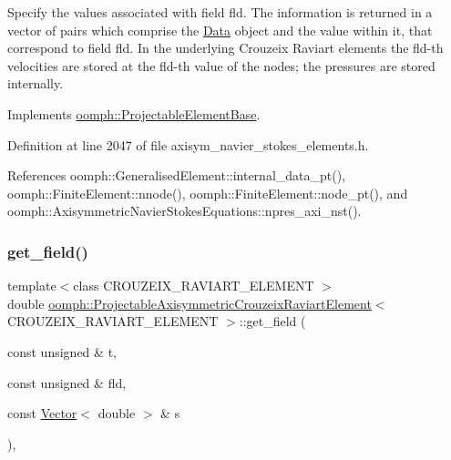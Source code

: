 Specify the values associated with field fld. The information is returned in a vector of pairs which comprise the \hyperlink{classoomph_1_1Data}{Data} object and the value within it, that correspond to field fld. In the underlying Crouzeix Raviart elements the fld-\/th velocities are stored at the fld-\/th value of the nodes; the pressures are stored internally. 



Implements \hyperlink{classoomph_1_1ProjectableElementBase_a644306ebdf16f334344c2d27d72f18b7}{oomph\+::\+Projectable\+Element\+Base}.



Definition at line 2047 of file axisym\+\_\+navier\+\_\+stokes\+\_\+elements.\+h.



References oomph\+::\+Generalised\+Element\+::internal\+\_\+data\+\_\+pt(), oomph\+::\+Finite\+Element\+::nnode(), oomph\+::\+Finite\+Element\+::node\+\_\+pt(), and oomph\+::\+Axisymmetric\+Navier\+Stokes\+Equations\+::npres\+\_\+axi\+\_\+nst().

\mbox{\label{classoomph_1_1ProjectableAxisymmetricCrouzeixRaviartElement_a2eea6fde7d2818d1053e4b1706883b34}} 
\subsubsection{\texorpdfstring{get\+\_\+field()}{get\_field()}}
{\footnotesize\ttfamily template$<$class C\+R\+O\+U\+Z\+E\+I\+X\+\_\+\+R\+A\+V\+I\+A\+R\+T\+\_\+\+E\+L\+E\+M\+E\+NT $>$ \\
double \hyperlink{classoomph_1_1ProjectableAxisymmetricCrouzeixRaviartElement}{oomph\+::\+Projectable\+Axisymmetric\+Crouzeix\+Raviart\+Element}$<$ C\+R\+O\+U\+Z\+E\+I\+X\+\_\+\+R\+A\+V\+I\+A\+R\+T\+\_\+\+E\+L\+E\+M\+E\+NT $>$\+::get\+\_\+field (\begin{DoxyParamCaption}\item[{const unsigned \&}]{t,  }\item[{const unsigned \&}]{fld,  }\item[{const \hyperlink{classoomph_1_1Vector}{Vector}$<$ double $>$ \&}]{s }\end{DoxyParamCaption})\hspace{0.3cm}{\ttfamily [inline]}, {\ttfamily [virtual]}}



